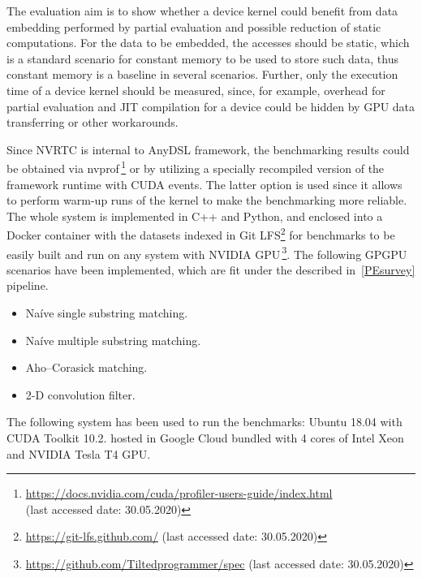The evaluation aim is to show whether a device kernel could benefit from data 
embedding performed by partial evaluation and possible reduction of 
static computations. For the data to be embedded, the accesses should 
be static, which is a standard scenario for constant memory to be used to store such data, 
thus constant memory is a baseline in several scenarios. 
Further, only the execution time of a device kernel should be measured, 
since, for example, overhead for partial evaluation and JIT compilation 
for a device could be hidden by GPU data transferring or other workarounds.

Since NVRTC is internal to AnyDSL framework, 
the benchmarking results could be obtained via 
nvprof\,\footnote{\url{https://docs.nvidia.com/cuda/profiler-users-guide/index.html} \\ (last accessed date: 30.05.2020)} 
or by utilizing a specially recompiled version of the framework 
runtime with CUDA events. 
The latter option is used since it allows to perform warm-up runs of the kernel 
to make the benchmarking more reliable. The whole system is implemented in C++ and Python, 
and enclosed into a Docker container with the datasets indexed in Git LFS\footnote{\url{https://git-lfs.github.com/} (last accessed date: 30.05.2020)}
 for benchmarks to be easily built and run on any system with NVIDIA GPU\,\footnote{\url{https://github.com/Tiltedprogrammer/spec} (last accessed date: 30.05.2020)}. 
 The following GPGPU scenarios have been implemented, which are fit under the described in~\ref{PEsurvey} pipeline.
\begin{itemize}
    \item Na\'ive single substring matching.
    \item Na\'ive multiple substring matching.
    \item Aho--Corasick matching.
    \item 2-D convolution filter.
\end{itemize}
The following system has been used to run the benchmarks: 
Ubuntu 18.04 with CUDA Toolkit 10.2. hosted in Google Cloud 
bundled with 4 cores of Intel Xeon and NVIDIA Tesla T4 GPU.
